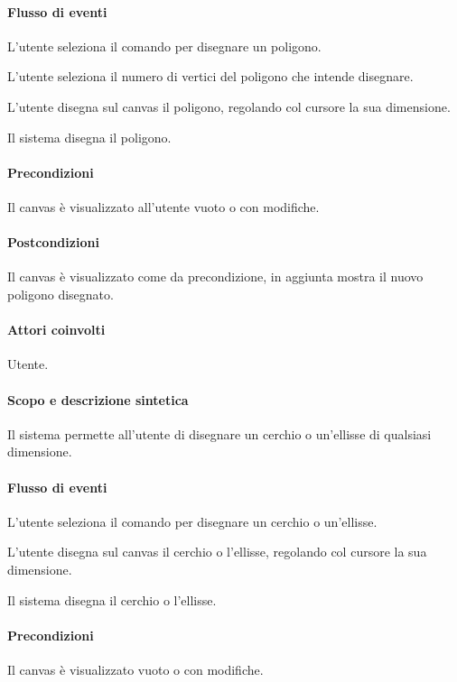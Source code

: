\paragraph{Flusso di eventi}
\begin{elenconumerato}[\textbf{}]{\subsubsecindent}
\item L'utente seleziona il comando per disegnare un poligono.
\item L'utente seleziona il numero di vertici del poligono che intende disegnare.
\item L'utente disegna sul canvas il poligono, regolando col cursore la sua dimensione.
\item Il sistema disegna il poligono.
\end{elenconumerato}
\paragraph{Precondizioni} Il canvas \`e visualizzato all'utente vuoto o con modifiche.
\paragraph{Postcondizioni} Il canvas \`e visualizzato come da precondizione, in aggiunta mostra il nuovo poligono disegnato.

\paragraph{Attori coinvolti} Utente.
\paragraph{Scopo e descrizione sintetica} 
Il sistema permette all'utente di disegnare un cerchio o un'ellisse di qualsiasi dimensione.
\paragraph{Flusso di eventi}
\begin{elenconumerato}[\textbf{}]{\subsubsecindent}
\item L'utente seleziona il comando per disegnare un cerchio o un'ellisse.
\item L'utente disegna sul canvas il cerchio o l'ellisse, regolando col cursore la sua dimensione.
\item Il sistema disegna il cerchio o l'ellisse.
\end{elenconumerato}
\paragraph{Precondizioni} Il canvas \`e visualizzato vuoto o con modifiche.

